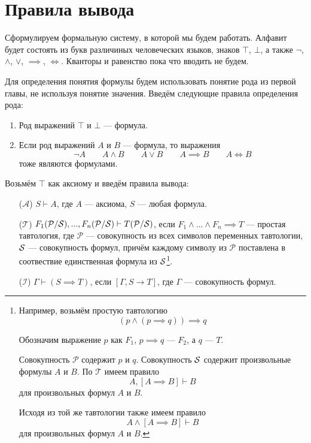\section{Правила вывода}

Сформулируем формальную систему, в которой мы будем работать.
Алфавит будет состоять из букв различиных человеческих языков, знаков $\top$,
$\bot$, а также $\lnot$, $\land$, $\lor$, $\implies$, $\iff$. Кванторы и равенство пока
что вводить не будем.

Для определения понятия формулы будем использовать понятие рода из первой главы,
не используя понятие значения.
Введём следующие правила определения рода:
\begin{enumerate}
	\item{}Род выражений $\top$ и $\bot$ --- формула.
	\item{}Если род выражений $A$ и $B$ --- формула, то выражения
	\[
		\lnot A\qquad A\land B\qquad A\lor B\qquad A\implies B\qquad A\iff B
	\]
	тоже являются формулами.
\end{enumerate}

Возьмём $\top$ как аксиому и введём правила вывода:

\newcommand\taut{$\mathcal T$}
\newcommand\axiom{$\mathcal A$}
\newcommand\conj{$\mathcal C$}
\newcommand\implic{$\mathcal I$}
\newcommand\Px{\mathcal P}
\begin{enumerate}
	\item[(\axiom)]{}$S\vdash A$, где $A$ --- аксиома, $S$ --- любая формула.

	\item[(\taut)]{}$F_1(\Px/\Sx),...,F_n(\Px/\Sx)\vdash T(\Px/\Sx)$,
	если ${F_1\land...\land F_n\implies T}$ --- простая тавтология, где
	$\Px$ --- совокупность из всех символов переменных тавтологии,
	$\mathcal S$ --- совокупность формул, причём каждому символу из $\Px$
	поставлена в соотвествие единственная формула из $\mathcal S$\footnote{
		Например, возьмём простую тавтологию
		\[
			(p\land (p\implies q))\implies q
		\]

		Обозначим выражение $p$ как $F_1$, $p\implies q$ --- $F_2$,
		а $q$ --- $T$.

		Совокупность $\Px$ содержит $p$ и $q$.
		Совокупность $\mathcal S$ содержит произвольные формулы $A$ и $B$.
		По \taut{} имеем правило
		\[
			A,[A\implies B]\vdash B
		\]
		для произвольных формул $A$ и $B$.

		Исходя из той же тавтологии также имеем правило
		\[
			A\land[A\implies B]\vdash B
		\]
		для произвольных формул $A$ и $B$.
	}.

	\item[(\implic)]{}${\Gamma\vdash (S\implies T)}$, если $[\Gamma,S\to T]$, где $\Gamma$
	--- совокупность формул.
\end{enumerate}

